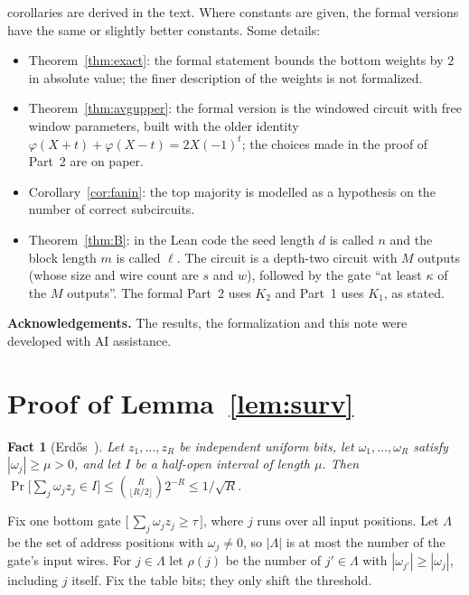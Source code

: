 \documentclass[11pt,letterpaper]{article}
\newtheorem{fact}[theorem]{Fact}
\theoremstyle{remark}
\newcommand{\ind}[1]{\bigl[\,#1\,\bigr]}
\newcommand{\sect}[1]{\section{\texorpdfstring{\color{ink}#1}{#1}}}
\newcommand{\smalltitle}[1]{\textbf{\color{ink}#1}\quad}
\begin{document}
corollaries are derived in the text. Where constants are given, the formal
versions have the same or slightly better constants. Some details:
\begin{itemize}
\item Theorem~\ref{thm:exact}: the formal statement bounds the bottom
      weights by $2$ in absolute value; the finer description of the weights
      is not formalized.
\item Theorem~\ref{thm:avgupper}: the formal version is the windowed circuit
      with free window parameters, built with the older identity
      $\varphi(X+t)+\varphi(X-t)=2X(-1)^t$; the choices made in the proof of
      Part~2 are on paper.
\item Corollary~\ref{cor:fanin}: the top majority is modelled as a hypothesis
      on the number of correct subcircuits.
\item Theorem~\ref{thm:B}: in the Lean code the seed length $d$ is called $n$
      and the block length $m$ is called $\ell$. The circuit is a depth-two
      circuit with $M$ outputs (whose size and wire count are $s$ and $w$),
      followed by the gate ``at least $\kappa$ of the $M$ outputs''. The formal
      Part~2 uses $K_2$ and Part~1 uses $K_1$, as stated.
\end{itemize}

\smalltitle{Acknowledgements.}
The results, the formalization and this note were developed with AI
assistance.

\appendix
\renewcommand{\thesection}{\Alph{section}}
\sect{Proof of Lemma~\ref{lem:surv}}\label{app:surv}

\begin{fact}[Erd\H{o}s~\cite{Erdos}]\label{fact:lo}
Let $z_1,\dots,z_R$ be independent uniform bits, let $\omega_1,\dots,\omega_R$
satisfy $|\omega_j|\ge\mu>0$, and let $I$ be a half-open interval of length
$\mu$. Then
$\Pr\bigl[\sum_j\omega_jz_j\in I\bigr]\le\binom{R}{\lfloor R/2\rfloor}2^{-R}\le1/\sqrt R$.
\end{fact}

Fix one bottom gate $\ind{\sum_j\omega_jz_j\ge\tau}$, where $j$ runs over
all input positions. Let $\Lambda$ be the set of address positions with
$\omega_j\ne0$, so $|\Lambda|$ is at most the number of the gate's input wires.
For $j\in \Lambda$ let $\rho(j)$ be the number of $j'\in \Lambda$ with
$|\omega_{j'}|\ge|\omega_j|$, including $j$ itself. Fix the table bits; they
only shift the threshold.
\end{document}
